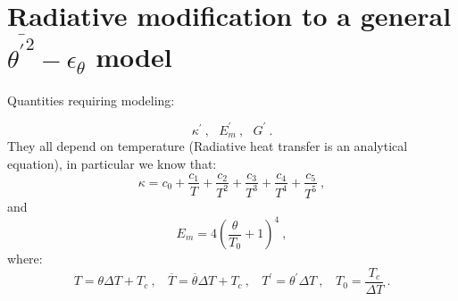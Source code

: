 \documentclass[10pt]{article}
\def\lp{\left(}
\def\rp{\right)}
\def\tp{\overline{{\theta^\prime}^2}}
\def\tm{\overline{\theta}}
\def\tr{{\theta^\prime}}
\begin{document}
\section*{Radiative modification to a general $\tp - \epsilon_{\theta}$ model}
\vspace{1cm}
Quantities requiring modeling:

\begin{equation*}
\kappa^\prime \ , \ \ \ E_m^\prime \ , \ \ \ G^\prime \ .
\end{equation*}
They all depend on temperature (Radiative heat transfer is an analytical equation), in particular we know that:
\begin{equation*}
\kappa = c_0 + \frac{c_1}{T} + \frac{c_2}{T^2} + \frac{c_3}{T^3} + \frac{c_4}{T^4} + \frac{c_5}{T^5} \ ,
\end{equation*}
and
\begin{equation*}
E_m = 4 {\lp \frac{\theta}{T_0} + 1\rp }^4 \ ,
\end{equation*}
where:
\begin{equation*}
T = \theta \Delta T + T_c \ ,  \ \ \ \ \overline{T} = \tm \Delta T+ T_c \ , \ \ \ \ T^\prime = \tr \Delta T \ , \ \ \ \ T_0 = \frac{T_c}{\Delta T} \ .
\end{equation*}
\end{document}

